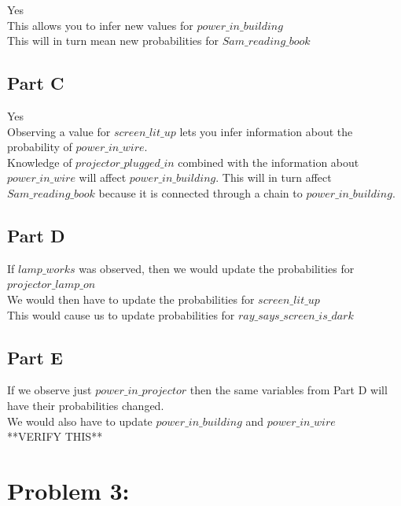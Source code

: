 \documentclass[twoside,11pt]{article}
\theoremstyle{definition}
\begin{document}
Yes\\
This allows you to infer new values for $\textit{power\_in\_building}$\\
This will in turn mean new probabilities for $\textit{Sam\_reading\_book}$\\

\subsection*{Part C}

Yes\\
Observing a value for $\textit{screen\_lit\_up}$ lets you infer information about the probability of $\textit{power\_in\_wire}$. \\
Knowledge of $\textit{projector\_plugged\_in}$ combined with the information about $\textit{power\_in\_wire}$ will affect $\textit{power\_in\_building}$. This will in turn affect  $\textit{Sam\_reading\_book}$ because it is connected through a chain to $\textit{power\_in\_building}$.

\subsection*{Part D}

If $\textit{lamp\_works}$ was observed, then we would update the probabilities for $\textit{projector\_lamp\_on}$\\
We would then have to update the probabilities for $\textit{screen\_lit\_up}$\\
This would cause us to update probabilities for $\textit{ray\_says\_screen\_is\_dark}$\\

\subsection*{Part E}

If we observe just $\textit{power\_in\_projector}$ then the same variables from Part D will have their probabilities changed.\\
We would also have to update $\textit{power\_in\_building}$ and $\textit{power\_in\_wire}$\\
**VERIFY THIS**

\newpage

\section*{Problem 3: }
\end{document}
